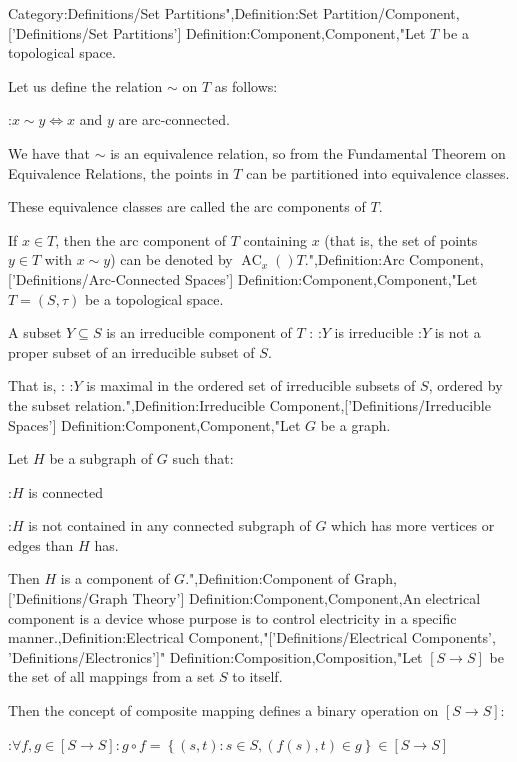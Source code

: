 Category:Definitions/Set Partitions",Definition:Set Partition/Component,['Definitions/Set Partitions']
Definition:Component,Component,"Let $T$ be a topological space.

Let us define the relation $\sim$ on $T$ as follows:

:$x \sim y \iff x$ and $y$ are arc-connected.


We have that $\sim $ is an equivalence relation, so from the Fundamental Theorem on Equivalence Relations, the points in $T$ can be partitioned into equivalence classes.

These equivalence classes are called the arc components of $T$.


If $x \in T$, then the arc component of $T$ containing $x$ (that is, the set of points $y \in T$ with $x \sim y$) can be denoted by $\operatorname {AC}_x \left(   \right)T$.",Definition:Arc Component,['Definitions/Arc-Connected Spaces']
Definition:Component,Component,"Let $T = \left( S, \tau \right)$ be a topological space.


A subset $Y \subseteq S$ is an irreducible component of $T$ :
:$Y$ is irreducible
:$Y$ is not a proper subset of an irreducible subset of $S$.

That is, :
:$Y$ is maximal in the ordered set of irreducible subsets of $S$, ordered by the subset relation.",Definition:Irreducible Component,['Definitions/Irreducible Spaces']
Definition:Component,Component,"Let $G$ be a graph.

Let $H$ be a subgraph of $G$ such that:

:$H$ is connected

:$H$ is not contained in any connected subgraph of $G$ which has more vertices or edges than $H$ has.


Then $H$ is a component of $G$.",Definition:Component of Graph,['Definitions/Graph Theory']
Definition:Component,Component,An electrical component is a device whose purpose is to control electricity in a specific manner.,Definition:Electrical Component,"['Definitions/Electrical Components', 'Definitions/Electronics']"
Definition:Composition,Composition,"Let $\left[ S \to S \right]$ be the set of all mappings from a set $S$ to itself.

Then the concept of composite mapping defines a binary operation on $\left[ S \to S \right]$:

:$\forall f, g \in \left[ S \to S \right]: g \circ f = \left\lbrace \left( s, t \right): s \in S, \left( f \left( s \right), t \right) \in g \right\rbrace \in \left[ S \to S \right]$


